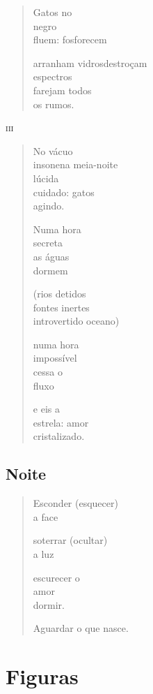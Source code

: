 \begin{verse}
Gatos no\\
negro\\
fluem: fosforecem

arranham vidros\qquad\qquad\quad destroçam\\
espectros\\
farejam todos\\
os rumos.
\end{verse}

\medskip
\textsc{iii}

\begin{verse}
No vácuo\\
insone\qquad\qquad\quad na meia-noite\\
lúcida\\
cuidado: gatos\\
agindo.

Numa hora\\
secreta\\
as águas\\
dormem

(rios detidos\\
\quad fontes inertes\\
\qquad introvertido oceano)

numa hora\\
impossível\\
cessa o\\
\qquad\quad fluxo

e eis a\\
estrela: amor\\
cristalizado.
\end{verse}

\chapter{Noite}

\begin{verse}
Esconder (esquecer)\\
a face

soterrar (ocultar)\\
a luz

escurecer o\\
amor\\
dormir.

Aguardar o que nasce.
\end{verse}

\part*{Figuras}

